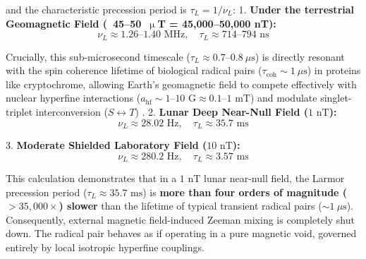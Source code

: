\documentclass[default,sn-nature,iicol]{sn-jnl}
\begin{document}
and the characteristic precession period is $\tau_L = 1 / \nu_L$:
1. \textbf{Under the terrestrial Geomagnetic Field (~45--50~$\upmu$T = 45,000--50,000 nT):}
\begin{equation}
\nu_L \approx 1.26\text{--}1.40\text{ MHz}, \quad \tau_L \approx 714\text{--}794\text{ ns}
\end{equation}

   Crucially, this sub-microsecond timescale ($\tau_L \approx 0.7\text{--}0.8\ \mu\text{s}$) is directly resonant with the spin coherence lifetime of biological radical pairs ($\tau_{\text{coh}} \sim 1\ \mu\text{s}$) in proteins like cryptochrome, allowing Earth's geomagnetic field to compete effectively with nuclear hyperfine interactions ($a_{\text{hf}} \sim 1\text{--}10\text{ G} \approx 0.1\text{--}1\text{ mT}$) and modulate singlet-triplet interconversion ($S \leftrightarrow T$) \cite{ref49,ref50}.
2. \textbf{Lunar Deep Near-Null Field ($1\text{ nT}$):}
\begin{equation}
\nu_L \approx 28.02\text{ Hz}, \quad \tau_L \approx 35.7\text{ ms}
\end{equation}

3. \textbf{Moderate Shielded Laboratory Field ($10\text{ nT}$):}
\begin{equation}
\nu_L \approx 280.2\text{ Hz}, \quad \tau_L \approx 3.57\text{ ms}
\end{equation}


This calculation demonstrates that in a $1\text{ nT}$ lunar near-null field, the Larmor precession period ($\tau_L \approx 35.7\text{ ms}$) is \textbf{more than four orders of magnitude ($>35,000\times$) slower} than the lifetime of typical transient radical pairs ($\sim 1\ \mu\text{s}$). Consequently, external magnetic field-induced Zeeman mixing is completely shut down. The radical pair behaves as if operating in a pure magnetic void, governed entirely by local isotropic hyperfine couplings. 
\end{document}
